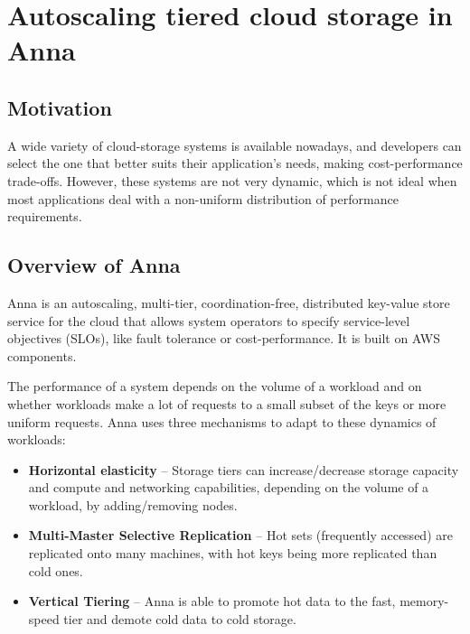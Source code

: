 \documentclass[14pt,oneside]{extreport}
\newcommand*\fpar{\hspace{1ex}}
\begin{document}
\chapter{\Large{Autoscaling tiered cloud storage in Anna \cite{paper2}}}
\vspace{-2em}
  \section{Motivation}
  \fpar A wide variety of cloud-storage systems is available nowadays, and developers can select the one that better suits their application’s needs, making cost-performance trade-offs. However, these systems are not very dynamic, which is not ideal when most applications deal with a non-uniform distribution of performance requirements.

  \section{Overview of Anna}
  \fpar Anna is an autoscaling, multi-tier, coordination-free, distributed key-value store service for the cloud that allows system operators to specify service-level objectives (SLOs), like fault tolerance or cost-performance. It is built on AWS components.
  \par The performance of a system depends on the volume of a workload and on whether workloads make a lot of requests to a small subset of the keys or more uniform requests. Anna uses three mechanisms to adapt to these dynamics of workloads:
  \begin{itemize}[noitemsep]
    \item \textbf{Horizontal elasticity} – Storage tiers can increase/decrease storage capacity and compute and networking capabilities, depending on the volume of a workload, by adding/removing nodes.
    \item \textbf{Multi-Master Selective Replication} – Hot sets (frequently accessed) are replicated onto many machines, with hot keys being more replicated than cold ones.
    \item \textbf{Vertical Tiering} – Anna is able to promote hot data to the fast, memory-speed tier and demote cold data to cold storage.
  \end{itemize}
\end{document}
